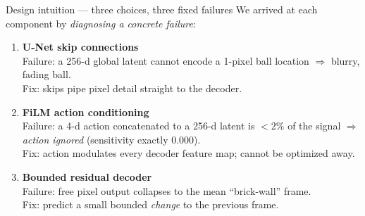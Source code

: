\documentclass[aspectratio=169]{beamer}
\newcommand{\good}[1]{\textcolor{cGood}{#1}}
\newcommand{\bad}[1]{\textcolor{cBad}{#1}}
\begin{document}
\begin{frame}{Design intuition --- three choices, three fixed failures}
  We arrived at each component by \emph{diagnosing a concrete failure}:

  \vspace{0.6em}
  \begin{enumerate}
    \item \textbf{U-Net skip connections} \\
      \bad{Failure:} a 256-d global latent cannot encode a 1-pixel ball location
      $\Rightarrow$ blurry, fading ball. \\
      \good{Fix:} skips pipe pixel detail straight to the decoder.

    \vspace{0.4em}
    \item \textbf{FiLM action conditioning} \\
      \bad{Failure:} a 4-d action concatenated to a 256-d latent is $<2\%$ of the
      signal $\Rightarrow$ \emph{action ignored} (sensitivity exactly $0.000$). \\
      \good{Fix:} action modulates every decoder feature map; cannot be optimized away.

    \vspace{0.4em}
    \item \textbf{Bounded residual decoder} \\
      \bad{Failure:} free pixel output collapses to the mean ``brick-wall'' frame. \\
      \good{Fix:} predict a small bounded \emph{change} to the previous frame.
  \end{enumerate}
\end{frame}
\end{document}
